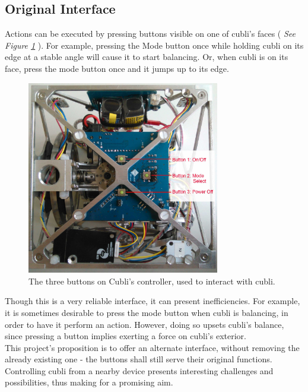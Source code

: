 \subsection{Original Interface}

Actions can be executed by pressing buttons visible on one of cubli's faces ( \textit{See Figure \ref{img:Buttons}} ). For example, pressing the Mode button once while holding cubli on its edge at a stable angle will cause it to start balancing. Or, when cubli is on its face, press the mode button once and it jumps up to its edge.\\

\begin{figure}[ht]
   \centering
   \includegraphics[width=0.75\textwidth]{img/Buttons.jpg}
   \caption{The three buttons on Cubli's controller, used to interact with cubli.}
   \label{img:Buttons}
\end{figure}

Though this is a very reliable interface, it can present inefficiencies. For example, it is sometimes desirable to press the mode button when cubli is balancing, in order to have it perform an action. However, doing so upsets cubli's balance, since pressing a button implies exerting a force on cubli's exterior.\\

This project's proposition is to offer an alternate interface, without removing the already existing one - the buttons shall still serve their original functions. Controlling cubli from a nearby device presents interesting challenges and possibilities, thus making for a promising aim.

